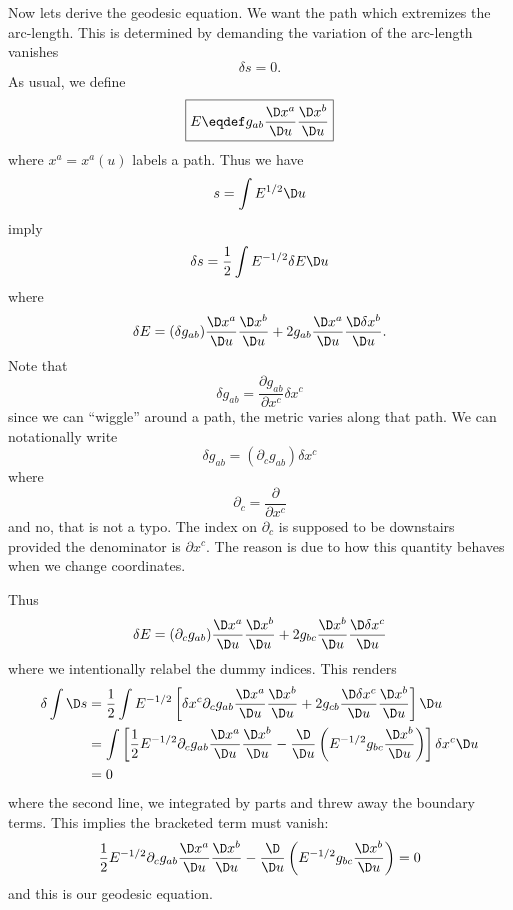 Now lets derive the geodesic equation. We want the path which
extremizes the arc-length. This is determined by demanding the
variation of the arc-length vanishes
\begin{equation}
\delta s=0.
\end{equation}
As usual, we define
\begin{equation}
\boxed{
E\eqdef g_{ab}\frac{\D x^{a}}{\D u}\frac{\D x^{b}}{\D u}
}
\end{equation}
where $x^{a}=x^{a}(u)$ labels a path. Thus we have
\begin{equation}
s=\int E^{1/2}\D u
\end{equation}
imply
\begin{equation}
\delta s = \frac{1}{2}\int E^{-1/2}\delta E\D u
\end{equation}
where
\begin{equation}
\delta E=(\delta g_{ab})\frac{\D x^{a}}{\D u}\frac{\D x^{b}}{\D u}
+2g_{ab}\frac{\D x^{a}}{\D u}\frac{\D\delta x^{b}}{\D u}.
\end{equation}
Note that
\begin{equation}
\delta g_{ab}=\frac{\partial g_{ab}}{\partial x^{c}}\delta x^{c}
\end{equation}
since we can ``wiggle'' around a path, the metric varies along
that path. We can notationally write
\begin{equation}
\delta g_{ab}=(\partial_{c} g_{ab})\delta x^{c}
\end{equation}
where
\begin{equation}
\partial_{c}=\frac{\partial}{\partial x^{c}}
\end{equation}
and no, that is not a typo. The index on $\partial_{c}$ is
supposed to be downstairs provided the denominator is $\partial
x^{c}$. The reason is due to how this quantity behaves when we
change coordinates.

Thus
\begin{equation}
\delta E=(\partial_{c}g_{ab})\frac{\D x^{a}}{\D u}\frac{\D x^{b}}{\D u}
+2g_{bc}\frac{\D x^{b}}{\D u}\frac{\D\delta x^{c}}{\D u}
\end{equation}
where we intentionally relabel the dummy indices. This renders
\begin{equation}
\begin{split}
\delta\int\D s&=
\frac{1}{2}\int E^{-1/2}\left[\delta
  x^{c}\partial_{c}g_{ab}\frac{\D x^{a}}{\D u}\frac{\D x^{b}}{\D u}
+2g_{cb}\frac{\D\delta x^{c}}{\D u}\frac{\D x^{b}}{\D u}\right]\D u\\
&=\int\left[\frac{1}{2}E^{-1/2}\partial_{c}g_{ab}\frac{\D x^{a}}{\D u}\frac{\D x^{b}}{\D u}
-\frac{\D}{\D u}\left(E^{-1/2}g_{bc}\frac{\D x^{b}}{\D u}\right)\right]\delta x^{c}\D u\\
&=0
\end{split}
\end{equation}
where the second line, we integrated by parts and threw away the
boundary terms. This implies the bracketed term must vanish:
\begin{equation}
\frac{1}{2}E^{-1/2}\partial_{c}g_{ab}\frac{\D x^{a}}{\D u}\frac{\D x^{b}}{\D u}
-\frac{\D}{\D u}\left(E^{-1/2}g_{bc}\frac{\D x^{b}}{\D u}\right)=0
\end{equation}
and this is our geodesic equation.

